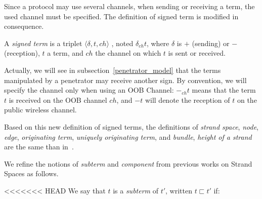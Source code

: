Since a protocol may use several channels, when sending or receiving a term, the used channel must be specified. The definition of signed term is modified in consequence. 

\begin{Definition}
A \emph{signed term} is a triplet $\langle \delta, t, ch  \rangle$ , noted $\delta_{ch} t$, where $\delta$ is $+$ (sending) or $-$ (reception), $t$ a term, and $ch$ the channel on which $t$ is sent or received.
\end{Definition}

Actually, we will see in subsection~\ref{penetrator_model} that the terms manipulated by a penetrator may receive another sign.
By convention, we will specify the channel only when using an OOB Channel: $-_{ch}t$ means that the term $t$ is received on the OOB channel $ch$, and $-t$ will denote the reception of $t$ on the public wireless channel.

Based on this new definition of signed terms, the definitions of \textit{strand space}, \textit{node}, \textit{edge}, \textit{originating term}, \textit{uniquely originating term}, and \textit{bundle}, \textit{height of a strand} are the same than in~\cite{674832}. 

We refine the notions of \textit{subterm} and \textit{component} from previous works on Strand Spaces as follows.

\begin{Definition}[Subterm]
<<<<<<< HEAD
We say that $t$ is a \emph{subterm} of $t'$, written $t \sqsubset t'$ if:
\end{Definition}

